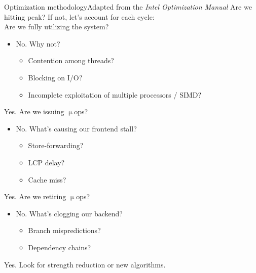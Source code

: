 \documentclass[mathserif,xcolor={dvipsnames,table}]{beamer}
\begin{document}
\begin{frame}{Optimization methodology\hfill\tiny{Adapted from the \textit{Intel Optimization Manual}}}
Are we hitting peak? If not, let's account for each cycle:\\
\vspace{.15in}
Are we fully utilizing the system?
\begin{itemize}
\item No. Why not?
\begin{itemize}
\item Contention among threads?
\item Blocking on I/O?
\item Incomplete exploitation of multiple processors / SIMD?
\end{itemize}
\end{itemize}
Yes. Are we issuing $\upmu$ops?
\begin{itemize}
\item No. What's causing our frontend stall?
\begin{itemize}
 \item Store-forwarding?
 \item LCP delay?
 \item Cache miss?
\end{itemize}
\end{itemize}
Yes. Are we retiring $\upmu$ops?
\begin{itemize}
 \item No. What's clogging our backend?
 \begin{itemize}
  \item Branch mispredictions?
  \item Dependency chains?
 \end{itemize}
\end{itemize}
Yes. Look for strength reduction or new algorithms.

\end{frame}
\end{document}
